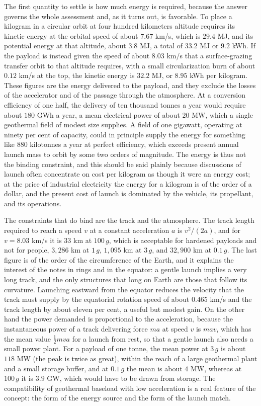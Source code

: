 The first quantity to settle is how much energy is required, because the answer governs the whole assessment and, as it turns out, is favorable. To place a kilogram in a circular orbit at four hundred kilometers altitude requires its kinetic energy at the orbital speed of about $7.67$ km/s, which is $29.4$ MJ, and its potential energy at that altitude, about $3.8$ MJ, a total of $33.2$ MJ or $9.2$ kWh. If the payload is instead given the speed of about $8.03$ km/s that a surface-grazing transfer orbit to that altitude requires, with a small circularization burn of about $0.12$ km/s at the top, the kinetic energy is $32.2$ MJ, or $8.95$ kWh per kilogram. These figures are the energy delivered to the payload, and they exclude the losses of the accelerator and of the passage through the atmosphere. At a conversion efficiency of one half, the delivery of ten thousand tonnes a year would require about $180$ GWh a year, a mean electrical power of about $20$ MW, which a single geothermal field of modest size supplies. A field of one gigawatt, operating at ninety per cent of capacity, could in principle supply the energy for something like $880$ kilotonnes a year at perfect efficiency, which exceeds present annual launch mass to orbit by some two orders of magnitude. The energy is thus not the binding constraint, and this should be said plainly because discussions of launch often concentrate on cost per kilogram as though it were an energy cost; at the price of industrial electricity the energy for a kilogram is of the order of a dollar, and the present cost of launch is dominated by the vehicle, its propellant, and its operations.

The constraints that do bind are the track and the atmosphere. The track length required to reach a speed $v$ at a constant acceleration $a$ is $v^2/(2a)$, and for $v=8.03$ km/s it is $33$ km at $100\,g$, which is acceptable for hardened payloads and not for people, $3{,}286$ km at $1\,g$, $1{,}095$ km at $3\,g$, and $32{,}900$ km at $0.1\,g$. The last figure is of the order of the circumference of the Earth, and it explains the interest of the notes in rings and in the equator: a gentle launch implies a very long track, and the only structures that long on Earth are those that follow its curvature. Launching eastward from the equator reduces the velocity that the track must supply by the equatorial rotation speed of about $0.465$ km/s and the track length by about eleven per cent, a useful but modest gain. On the other hand the power demanded is proportional to the acceleration, because the instantaneous power of a track delivering force $ma$ at speed $v$ is $mav$, which has the mean value $\tfrac12mva$ for a launch from rest, so that a gentle launch also needs a small power plant. For a payload of one tonne, the mean power at $3\,g$ is about $118$ MW (the peak is twice as great), within the reach of a large geothermal plant and a small storage buffer, and at $0.1\,g$ the mean is about $4$ MW, whereas at $100\,g$ it is $3.9$ GW, which would have to be drawn from storage. The compatibility of geothermal baseload with low acceleration is a real feature of the concept: the form of the energy source and the form of the launch match.


